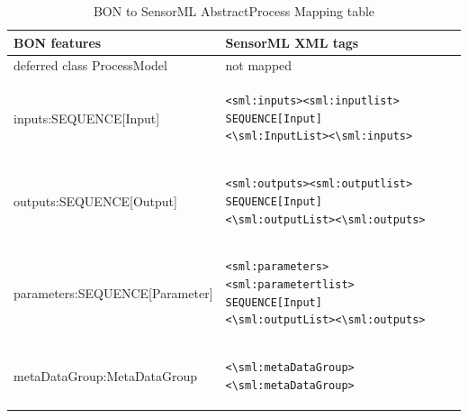 \documentclass[]{final_report}
\begin{document}
\begin{table}[!th]
\centering
\begin{tabular}{|l|l|}
\hline
BON features & SensorML XML tags\\
\hline
   deferred class ProcessModel  & not mapped\\
\hline     
     inputs:SEQUENCE[Input] & \begin{lstlisting}
<sml:inputs><sml:inputlist>
SEQUENCE[Input]
<\sml:InputList><\sml:inputs>\end{lstlisting}\\

\hline 
     outputs:SEQUENCE[Output] & \begin{lstlisting}
<sml:outputs><sml:outputlist>
SEQUENCE[Input]
<\sml:outputList><\sml:outputs>\end{lstlisting}\\
\hline
     parameters:SEQUENCE[Parameter] & \begin{lstlisting}
<sml:parameters><sml:parametertlist>
SEQUENCE[Input]
<\sml:outputList><\sml:outputs>\end{lstlisting}\\

\hline                 
     metaDataGroup:MetaDataGroup &  \begin{lstlisting}
<\sml:metaDataGroup><\sml:metaDataGroup>\end{lstlisting}\\
 \hline    

\end{tabular}
\caption{BON to SensorML AbstractProcess Mapping table}\label{table:bon_sml_example}
\label{ex:table}
\end{table}
\end{document}
